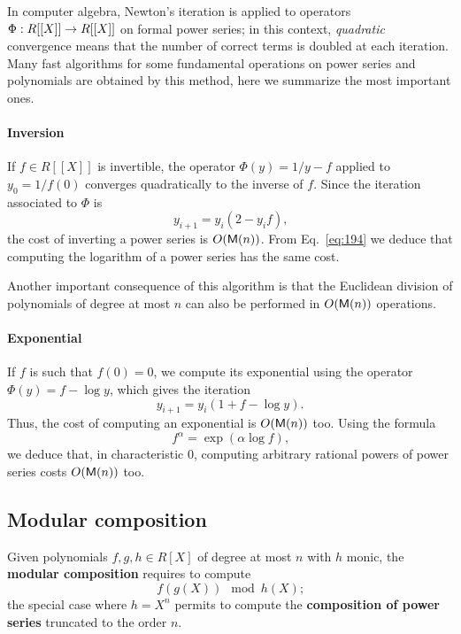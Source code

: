 In computer algebra, Newton's iteration is applied to operators
$\Phi:R[[X]]\rightarrow R[[X]]$ on formal power series; in this context,
\emph{quadratic} convergence means that the number of correct terms is
doubled at each iteration. Many fast algorithms for some fundamental
operations on power series and polynomials are obtained by this
method, here we summarize the most important ones.

\paragraph{Inversion}
If $f\in R[[X]]$ is invertible, the operator $\Phi(y) = 1/y - f$
applied to $y_0=1/f(0)$ converges quadratically to the inverse of
$f$. Since the iteration associated to $\Phi$ is
\begin{equation}
  \label{eq:193}
  y_{i+1} = y_i(2 - y_if)
  \text{,}
\end{equation}
the cost of inverting a power series is $O(\mathsf{M}(n))$. From
Eq.~\eqref{eq:194} we deduce that computing the logarithm of a power
series has the same cost.

Another important consequence of this algorithm is that the Euclidean
division of polynomials of degree at most $n$ can also be performed in
$O(\mathsf{M}(n))$ operations.

\paragraph{Exponential}
If $f$ is such that $f(0)=0$, we compute its exponential using the
operator $\Phi(y)=f-\log y$, which gives the iteration
\begin{equation}
  \label{eq:196}
  y_{i+1} = y_i(1 + f - \log y)
  \text{.}
\end{equation}
Thus, the cost of computing an exponential is $O(\mathsf{M}(n))$ too. Using
the formula
\begin{equation}
  \label{eq:201}
  f^\alpha = \exp(\alpha\log f)
  \text{,}
\end{equation}
we deduce that, in characteristic $0$, computing arbitrary rational
powers of power series costs $O(\mathsf{M}(n))$ too.


\subsection{Modular composition}
\label{sec:modular-composition}
Given polynomials $f,g,h\in R[X]$ of degree at most $n$ with $h$
monic, the \textbf{modular composition}
requires to compute
\begin{equation}
  \label{eq:190}
  f(g(X)) \mod h(X)
  \text{;}
\end{equation}
the special case where $h=X^n$ permits to compute the
\textbf{composition of power
  series} truncated to the order $n$.

